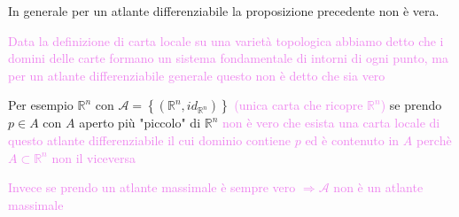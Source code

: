         \begin{esempio}[controesempio]
        \label{es:controesempio_atlante_massimale_su_Rn}
        \mbox{}

        In generale per un atlante differenziabile la proposizione precedente non è vera. 

        \textcolor{violet}{Data la definizione di carta locale su una varietà topologica abbiamo detto che i domini delle carte formano un sistema fondamentale di intorni di ogni punto, ma per un atlante
        differenziabile generale questo non è detto che sia vero}
        
        Per esempio $\mathbb{R}^n$ con $\mathcal{A}=\left\{  \left( \mathbb{R}^n, id_{\mathbb{R}^n}\right) \right\}$ \textcolor{violet}{(unica carta che ricopre $\mathbb{R}^n$)} 
        se prendo $p \in A$ con $A$ aperto più "piccolo" di $\mathbb{R}^n$ \textcolor{violet}{non è vero che esista una carta locale di questo atlante differenziabile il cui 
        dominio contiene $p$ ed è contenuto in $A$ perchè $A \subset \mathbb{R}^n$ non il viceversa}
        
        \textcolor{violet}{Invece se prendo un atlante massimale è sempre vero $\Rightarrow \mathcal{A}$ non è un atlante massimale}
        \end{esempio}
